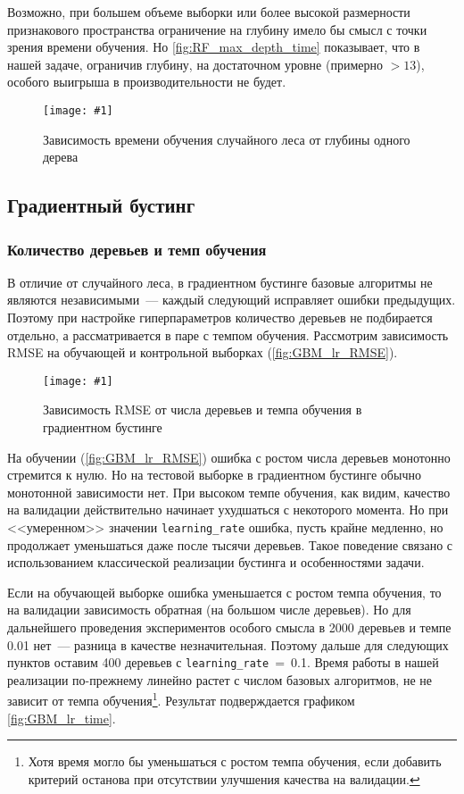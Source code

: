 \documentclass[12pt]{article}
\newcommand{\mpl}[2]{
    \begin{figure}[!h]
        \texttt{[image: \#1]}
        \centering
        \caption{#2}
        \label{fig:#1}
     \end{figure}
}
\begin{document}
Возможно, при большем объеме выборки или более высокой размерности признакового пространства ограничение на глубину имело бы смысл с точки зрения времени обучения. Но \autoref{fig:RF_max_depth_time} показывает, что в нашей задаче, ограничив глубину, на достаточном уровне (примерно $>13$), особого выигрыша в производительности не будет.
\mpl{RF_max_depth_time}{Зависимость времени обучения случайного леса от глубины одного дерева}

\subsection{Градиентный бустинг}
\subsubsection{Количество деревьев и темп обучения}
В отличие от случайного леса, в градиентном бустинге базовые алгоритмы не являются независимыми~--- каждый следующий исправляет ошибки предыдущих. Поэтому при настройке гиперпараметров количество деревьев не подбирается отдельно, а рассматривается в паре с темпом обучения. Рассмотрим зависимость RMSE на обучающей и контрольной выборках (\autoref{fig:GBM_lr_RMSE}).

\mpl{GBM_lr_RMSE}{Зависимость RMSE от числа деревьев и темпа обучения в градиентном бустинге}

На обучении (\autoref{fig:GBM_lr_RMSE}) ошибка с ростом числа деревьев монотонно стремится к нулю. Но на тестовой выборке в градиентном бустинге обычно монотонной зависимости нет. При высоком темпе обучения, как видим, качество на валидации действительно начинает ухудшаться с некоторого момента. Но при <<умеренном>> значении \verb|learning_rate| ошибка, пусть крайне медленно, но продолжает уменьшаться даже после тысячи деревьев. Такое поведение связано с использованием классической реализации бустинга и особенностями задачи. 

Если на обучающей выборке ошибка уменьшается с ростом темпа обучения, то на валидации зависимость обратная (на большом числе деревьев). Но для дальнейшего проведения экспериментов особого смысла в 2000 деревьев и темпе 0.01 нет~--- разница в качестве незначительная. Поэтому дальше для следующих пунктов оставим 400 деревьев с \verb|learning_rate|~=~0.1. Время работы в нашей реализации по-прежнему линейно растет с числом базовых алгоритмов, не не зависит от темпа обучения\footnote{Хотя время могло бы уменьшаться с ростом темпа обучения, если добавить критерий останова при отсутствии улучшения качества на валидации.}. Результат подверждается графиком \autoref{fig:GBM_lr_time}.
\end{document}
